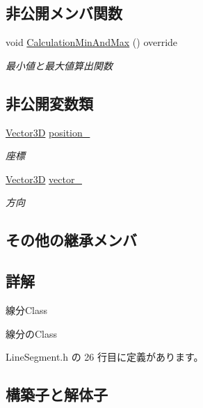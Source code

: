 \subsection*{非公開メンバ関数}
\begin{DoxyCompactItemize}
\item 
void \mbox{\hyperlink{class_line_segment_aa680211e185d2c98febb5af5a6527496}{Calculation\+Min\+And\+Max}} () override
\begin{DoxyCompactList}\small\item\em 最小値と最大値算出関数 \end{DoxyCompactList}\end{DoxyCompactItemize}
\subsection*{非公開変数類}
\begin{DoxyCompactItemize}
\item 
\mbox{\hyperlink{class_vector3_d}{Vector3D}} \mbox{\hyperlink{class_line_segment_a2b62cbe86bc97fccece2b098d83d643e}{position\+\_\+}}
\begin{DoxyCompactList}\small\item\em 座標 \end{DoxyCompactList}\item 
\mbox{\hyperlink{class_vector3_d}{Vector3D}} \mbox{\hyperlink{class_line_segment_a8a0af480c7798ce5d9975dce984cae38}{vector\+\_\+}}
\begin{DoxyCompactList}\small\item\em 方向 \end{DoxyCompactList}\end{DoxyCompactItemize}
\subsection*{その他の継承メンバ}


\subsection{詳解}
線分\+Class 

線分の\+Class 

 Line\+Segment.\+h の 26 行目に定義があります。



\subsection{構築子と解体子}
\mbox{\label{class_line_segment_a80a0c88079f054dedc3b9d98717957d7}} 
